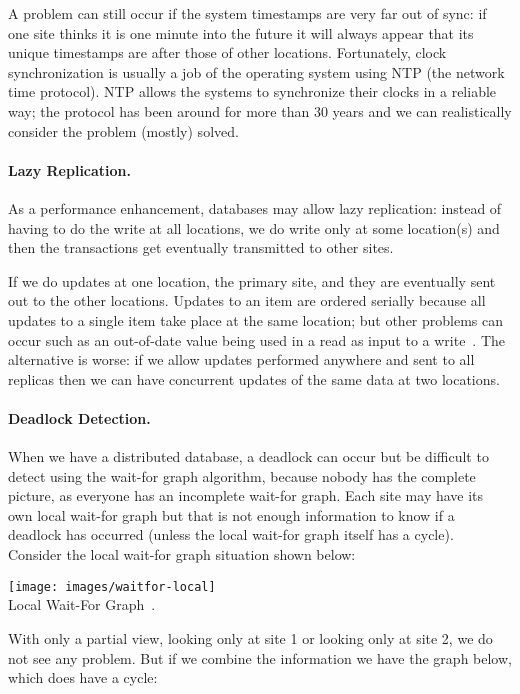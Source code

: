A problem can still occur if the system timestamps are very far out of sync: if one site thinks it is one minute into the future it will always appear that its unique timestamps are after those of other locations. Fortunately, clock synchronization is usually a job of the operating system using NTP (the network time protocol). NTP allows the systems to synchronize their clocks in a reliable way; the protocol has been around for more than 30 years and we can realistically consider the problem (mostly) solved.

\paragraph{Lazy Replication.} As a performance enhancement, databases may allow lazy replication: instead of having to do the write at all locations, we do write only at some location(s) and then the transactions get eventually transmitted to other sites.

If we do updates at one location, the primary site, and they are eventually sent out to the other locations. Updates to an item are ordered serially because all updates to a single item take place at the same location; but other problems can occur such as an out-of-date value being used in a read as input to a write~\cite{dsc}. The alternative is worse: if we allow updates performed anywhere and sent to all replicas then we can have concurrent updates of the same data at two locations.

\paragraph{Deadlock Detection.}

When we have a distributed database, a deadlock can occur but be difficult to detect using the wait-for graph algorithm, because nobody has the complete picture, as everyone has an incomplete wait-for graph. Each site may have its own local wait-for graph but that is not enough information to know if a deadlock has occurred (unless the local wait-for graph itself has a cycle). Consider the local wait-for graph situation shown below:

\begin{center}
\texttt{[image: images/waitfor-local]}\\
Local Wait-For Graph~\cite{dsc}.
\end{center}

With only a partial view, looking only at site 1 or looking only at site 2, we do not see any problem. But if we combine the information we have the graph below, which does have a cycle:

